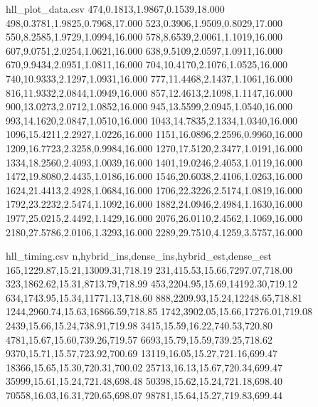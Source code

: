 \begin{filecontents*}{hll_plot_data.csv}
474,0.1813,1.9867,0.1539,18.000
498,0.3781,1.9825,0.7968,17.000
523,0.3906,1.9509,0.8029,17.000
550,8.2585,1.9729,1.0994,16.000
578,8.6539,2.0061,1.1019,16.000
607,9.0751,2.0254,1.0621,16.000
638,9.5109,2.0597,1.0911,16.000
670,9.9434,2.0951,1.0811,16.000
704,10.4170,2.1076,1.0525,16.000
740,10.9333,2.1297,1.0931,16.000
777,11.4468,2.1437,1.1061,16.000
816,11.9332,2.0844,1.0949,16.000
857,12.4613,2.1098,1.1147,16.000
900,13.0273,2.0712,1.0852,16.000
945,13.5599,2.0945,1.0540,16.000
993,14.1620,2.0847,1.0510,16.000
1043,14.7835,2.1334,1.0340,16.000
1096,15.4211,2.2927,1.0226,16.000
1151,16.0896,2.2596,0.9960,16.000
1209,16.7723,2.3258,0.9984,16.000
1270,17.5120,2.3477,1.0191,16.000
1334,18.2560,2.4093,1.0039,16.000
1401,19.0246,2.4053,1.0119,16.000
1472,19.8080,2.4435,1.0186,16.000
1546,20.6038,2.4106,1.0263,16.000
1624,21.4413,2.4928,1.0684,16.000
1706,22.3226,2.5174,1.0819,16.000
1792,23.2232,2.5474,1.1092,16.000
1882,24.0946,2.4984,1.1630,16.000
1977,25.0215,2.4492,1.1429,16.000
2076,26.0110,2.4562,1.1069,16.000
2180,27.5786,2.0106,1.3293,16.000
2289,29.7510,4.1259,3.5757,16.000
\end{filecontents*}
\begin{filecontents*}{hll_timing.csv}
n,hybrid_ins,dense_ins,hybrid_est,dense_est
165,1229.87,15.21,13009.31,718.19
231,415.53,15.66,7297.07,718.00
323,1862.62,15.31,8713.79,718.99
453,2204.95,15.69,14192.30,719.12
634,1743.95,15.34,11771.13,718.60
888,2209.93,15.24,12248.65,718.81
1244,2960.74,15.63,16866.59,718.85
1742,3902.05,15.66,17276.01,719.08
2439,15.66,15.24,738.91,719.98
3415,15.59,16.22,740.53,720.80
4781,15.67,15.60,739.26,719.57
6693,15.79,15.59,739.25,718.62
9370,15.71,15.57,723.92,700.69
13119,16.05,15.27,721.16,699.47
18366,15.65,15.30,720.31,700.02
25713,16.13,15.67,720.34,699.47
35999,15.61,15.24,721.48,698.48
50398,15.62,15.24,721.18,698.40
70558,16.03,16.31,720.65,698.07
98781,15.64,15.27,719.83,699.44
\end{filecontents*}
\documentclass[11pt,a4paper]{article}
\usepackage[margin=1.6cm]{geometry}
\usepackage{amsmath,amssymb,graphicx}
\usepackage{pgfplots}
\pgfplotsset{compat=1.16}
\usetikzlibrary{positioning}
\usepackage{algpseudocode}
\pagestyle{empty}

\begin{center}\large\textbf{Hash-list cardinality correction (table-free occupancy inverse)}\end{center}

\medskip
\noindent\textbf{Setting.} We want the number of distinct items $n$ in a large stream while storing far less memory than the items themselves. This is cardinality estimation, and HyperLogLog (HLL) is the standard tool. It hashes each item and keeps an array of $m=2^{P}$ small counters called registers, and from their distribution it estimates $n$ with a relative error of about $1.04/$ regardless of $n$. That array is the dense representation.

